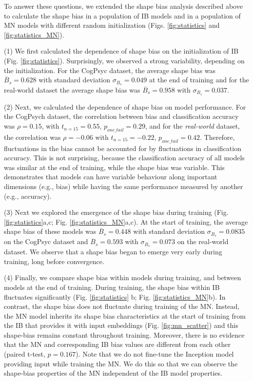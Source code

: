 \documentclass{article}
\begin{document}
To answer these questions, we extended the shape bias analysis described above to calculate the shape bias in a population of IB models and in a population of MN models with different random initialization (Figs. \ref{fig:statistics} and \ref{fig:statistics_MN}).

(1) We first calculated the dependence of shape bias on the initialization of IB (Fig. \ref{fig:statistics}). Surprisingly, we observed a strong variability, depending on the initialization. For the CogPsyc dataset, the average shape bias was $\overline{B}_s = 0.628$ with standard deviation $\sigma_{B_s} = 0.049$ at the end of training and for the real-world dataset the average shape bias was $\overline{B}_s = 0.958$ with $\sigma_{B_s} = 0.037$. 

(2) Next, we calculated the dependence of shape bias on model performance. For the CogPsych dataset, the correlation between bias and classification accuracy was $\rho=0.15$, with $t_{n=15}=0.55$, $p_{one\_tail}=0.29$, and for the \textit{real-world} dataset, the correlation was $\rho=-0.06$ with $t_{n=15}=-0.22$, $p_{one\_tail}=0.42$. Therefore, fluctuations in the bias cannot be accounted for by fluctuations in classification accuracy. This is not surprising, because the classification accuracy of all models was similar at the end of training, while the shape bias was variable. This demonstrates that models can have variable behaviour along important dimensions (e.g., bias) while having the same performance measured by another (e.g., accuracy). 

(3) Next we explored the emergence of the shape bias during training (Fig. \ref{fig:statistics}a,c; Fig. \ref{fig:statistics_MN}a,c). At the start of training, the average shape bias of these models was $\overline{B}_s = 0.448$ with standard deviation $\sigma_{B_s} = 0.0835$ on the CogPsyc dataset and $\overline{B}_s = 0.593$ with $\sigma_{B_s}= 0.073$ on the real-world dataset. We observe that a shape bias began to emerge very early during training, long before convergence. 

(4) Finally, we compare shape bias within models during training, and between models at the end of training. During training, the shape bias within IB fluctuates significantly (Fig. \ref{fig:statistics} b; Fig. \ref{fig:statistics_MN}b). In contrast, the shape bias does not fluctuate during training of the MN. Instead, the MN model inherits its shape bias characteristics at the start of training from the IB that provides it with input embeddings (Fig. \ref{fig:mn_scatter}) and this shape-bias remains constant throughout training. Moreover, there is no evidence that the MN and corresponding IB bias values are different from each other (paired t-test, $p = 0.167$). Note that we do not fine-tune the Inception model providing input while training the MN. We do this so that we can observe the shape-bias properties of the MN independent of the IB model properties.
\end{document}
